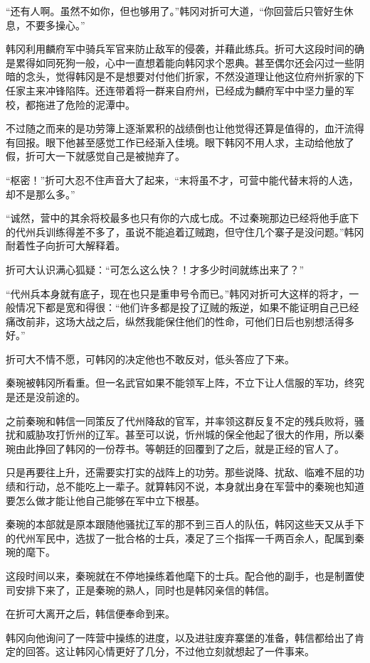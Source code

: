“还有人啊。虽然不如你，但也够用了。”韩冈对折可大道，“你回营后只管好生休息，不要多操心。”

韩冈利用麟府军中骑兵军官来防止敌军的侵袭，并藉此练兵。折可大这段时间的确是累得如同死狗一般，心中一直想着能向韩冈求个恩典。甚至偶尔还会闪过一些阴暗的念头，觉得韩冈是不是想要对付他们折家，不然没道理让他这位府州折家的下任家主来冲锋陷阵。还连带着将一群来自府州，已经成为麟府军中中坚力量的军校，都拖进了危险的泥潭中。

不过随之而来的是功劳簿上逐渐累积的战绩倒也让他觉得还算是值得的，血汗流得有回报。眼下他甚至感觉工作已经渐入佳境。眼下韩冈不用人求，主动给他放了假，折可大一下就感觉自己是被抛弃了。

“枢密！”折可大忍不住声音大了起来，“末将虽不才，可营中能代替末将的人选，却不是那么多。”

“诚然，营中的其余将校最多也只有你的六成七成。不过秦琬那边已经将他手底下的代州兵训练得差不多了，虽说不能追着辽贼跑，但守住几个寨子是没问题。”韩冈耐着性子向折可大解释着。

折可大认识满心狐疑：“可怎么这么快？！才多少时间就练出来了？”

“代州兵本身就有底子，现在也只是重申号令而已。”韩冈对折可大这样的将才，一般情况下都是宽和得很：“他们许多都是投了辽贼的叛逆，如果不能证明自己已经痛改前非，这场大战之后，纵然我能保住他们的性命，可他们日后也别想活得多好。”

折可大不情不愿，可韩冈的决定他也不敢反对，低头答应了下来。

秦琬被韩冈所看重。但一名武官如果不能领军上阵，不立下让人信服的军功，终究是还是没前途的。

之前秦琬和韩信一同策反了代州降敌的官军，并率领这群反复不定的残兵败将，骚扰和威胁攻打忻州的辽军。甚至可以说，忻州城的保全他起了很大的作用，所以秦琬由此挣回了韩冈的一份荐书。等朝廷的回覆到了之后，就是正经的官人了。

只是再要往上升，还需要实打实的战阵上的功劳。那些说降、扰敌、临难不屈的功绩和行动，总不能吃上一辈子。就算韩冈不说，本身就出身在军营中的秦琬也知道要怎么做才能让他自己能够在军中立下根基。

秦琬的本部就是原本跟随他骚扰辽军的那不到三百人的队伍，韩冈这些天又从手下的代州军民中，选拔了一批合格的士兵，凑足了三个指挥一千两百余人，配属到秦琬的麾下。

这段时间以来，秦琬就在不停地操练着他麾下的士兵。配合他的副手，也是制置使司安排下来了，正是秦琬的熟人，同时也是韩冈亲信的韩信。

在折可大离开之后，韩信便奉命到来。

韩冈向他询问了一阵营中操练的进度，以及进驻废弃寨堡的准备，韩信都给出了肯定的回答。这让韩冈心情更好了几分，不过他立刻就想起了一件事来。

